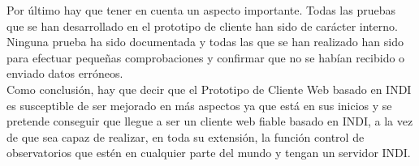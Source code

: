 Por último hay que tener en cuenta un aspecto importante. Todas las pruebas que se han desarrollado en el prototipo de cliente han sido de carácter interno. Ninguna prueba ha sido documentada y todas las que se han realizado han sido para efectuar pequeñas comprobaciones y confirmar que no se habían recibido o enviado datos erróneos.\\

Como conclusión, hay que decir que el Prototipo de Cliente Web basado en INDI es susceptible de ser mejorado en más aspectos ya que está en sus inicios y se pretende conseguir que llegue a ser un cliente web fiable basado en INDI, a la vez de que sea capaz de realizar, en toda su extensión, la función control de observatorios que estén en cualquier parte del mundo y tengan un servidor INDI.\\
